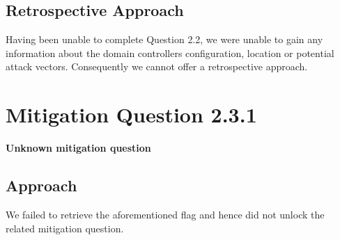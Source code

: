 \subsection{Retrospective Approach}
Having been unable to complete Question 2.2, we were unable to gain any information about the domain controllers configuration, location or potential attack vectors. Consequently we cannot offer a retrospective approach.
\section{Mitigation Question 2.3.1}
\textbf{Unknown mitigation question}
\subsection{Approach}
We failed to retrieve the aforementioned flag and hence did not unlock the
related mitigation question.
